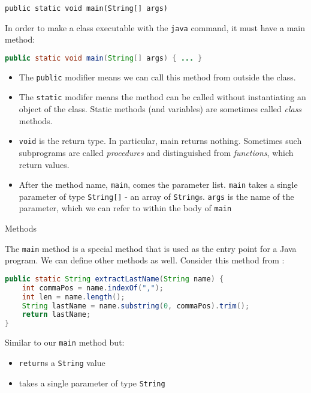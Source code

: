 \documentclass{beamer}
\begin{document}
\begin{frame}[fragile]{{\tt public static void main(String[] args)}}


In order to make a class executable with the {\tt java} command, it must have a main method:
\begin{lstlisting}[language=Java]
public static void main(String[] args) { ... }
\end{lstlisting}
\vspace{-.1in}
\begin{itemize}
\item The {\tt public} modifier means we can call this method from outside the class.
\item The {\tt static} modifer means the method can be called without instantiating an object of the class.  Static methods (and variables) are sometimes called {\it class} methods.
\item {\tt void} is the return type.  In particular, main returns nothing.  Sometimes such subprograms are called {\it procedures} and distinguished from {\it functions}, which return values.
\item After the method name, {\tt main}, comes the parameter list.  {\tt main} takes a single parameter of type {\tt String[]} - an array of {\tt String}s.  {\tt args} is the name of the parameter, which we can refer to within the body of {\tt main}
\end{itemize}

\end{frame}

\begin{frame}[fragile]{Methods}

The {\tt main} method is a special method that is used as the entry point for a Java program.  We can define other methods as well.  Consider this method from :

\begin{lstlisting}[language=Java]
public static String extractLastName(String name) {
    int commaPos = name.indexOf(",");
    int len = name.length();
    String lastName = name.substring(0, commaPos).trim();
    return lastName;
}
\end{lstlisting}
Similar to our {\tt main} method but:
\begin{itemize}
\item {\tt return}s a {\tt String} value
\item takes a single parameter of type {\tt String}
\end{itemize}

\end{frame}
\end{document}
